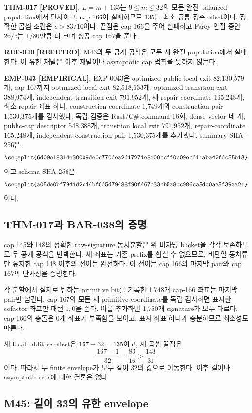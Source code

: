 \documentclass[11pt]{article}
\newcommand{\claimstatus}[2]{\textbf{#1 [#2]}}
\begin{document}
\claimstatus{THM-017}{PROVED}.
\(L=m+135\)는 \(9\le m\le32\)의 모든 완전 balanced population에서
단사이고, cap 166이 실패하므로 135는 최소 공통 정수 offset이다.
정확한 곱셈 조건은 \(c>83/16\)이다. 끝점은 cap 166을 주어 실패하고
Farey 인접 증인 \(26/5\)는 \(1/80\)만큼 더 크며 성공 cap 167을 준다.

\claimstatus{REF-040}{REFUTED}.
M43의 두 공개 공식은 모두 새 완전 population에서 실패한다. 이 유한
재발은 이후 재발이나 asymptotic cap 법칙을 뜻하지 않는다.

\claimstatus{EMP-043}{EMPIRICAL}.
EXP-0043은 optimized public local exit 82,130,579개, cap-167까지
optimized local exit 82,518,653개, optimized transition exit
388,074개, independent transition exit 791,952개, 새
repair-coordinate 165,248개, 최소 repair 좌표 하나, construction
coordinate 1,749개와 construction pair 1,530,375개를 검사했다.
독립 검증은 Rust/C\# command 16회, dense vector 네 개, public-cap
descriptor 548,388개, transition local exit 791,952개,
repair-coordinate 165,248개, independent construction pair
1,530,375개를 추가했다. summary SHA-256은
\[
\texttt{\seqsplit{6d09e1831de30009de0e770dea2d17271e8e00ccff0c09ecd11aba42fdc55b13}}
\]
이고 schema SHA-256은
\[
\texttt{\seqsplit{a05de0bf7941d2c44bf0d5d79488f90f467c33cb5a8ec986ca5de0aa5f39aa21}}
\]
이다.

\subsection{THM-017과 BAR-038의 증명}

cap 145와 148의 정확한 raw-signature 동치분할은 위 비자명 bucket을
각각 보존하므로 두 공개 공식을 반박한다. 새 좌표는 기존 prefix를
합칠 수 없으므로, 비단일 동치류만 유지한 cap 148 이후의 전이는
완전하다. 이 전이는 cap 166의 마지막 pair와 cap 167의 단사성을
증명한다.

각 분할에서 실제로 변하는 primitive bit를 기록한 1,748개 cap-166
좌표는 마지막 pair만 남긴다. cap 167의 모든 새 primitive coordinate를
독립 검사하면 표시한 cofactor 좌표만 패턴 \(1,0\)을 준다. 이를
추가하면 1,750개 signature가 모두 다르다. cap 166의 충돌은 0개
좌표가 부족함을 보이고, 표시 좌표 하나가 충분하므로 최소성도 따른다.

새 local additive offset은 \(167-32=135\)이고, 새 곱셈 끝점은
\[
\frac{167-1}{32}=\frac{83}{16}>\frac{143}{31}
\]
이다. 따라서 두 finite envelope가 모두 길이 32의 값으로 이동한다.
이후 길이나 asymptotic rate에 대한 결론은 없다.

\subsection{M45: 길이 33의 유한 envelope}
\end{document}
